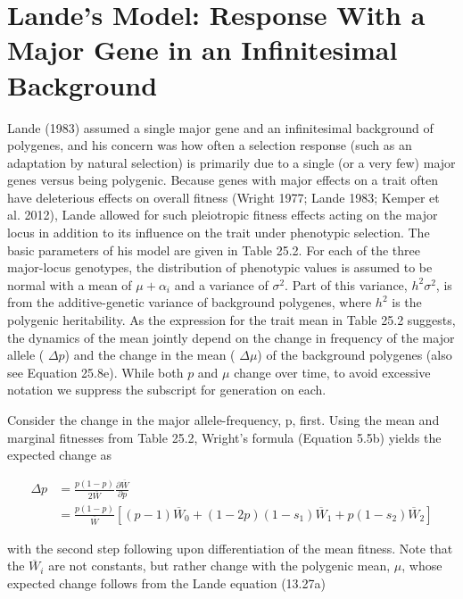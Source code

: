 \documentclass{article}
\begin{document}
\section{Lande's Model: Response With a Major Gene in an Infinitesimal Background}
Lande (1983) assumed a single major gene and an infinitesimal background of polygenes, and his concern was how often a selection response (such as an adaptation by natural selection) is primarily due to a single (or a very few) major genes versus being polygenic. Because genes with major effects on a trait often have deleterious effects on overall fitness (Wright 1977; Lande 1983; Kemper et al. 2012), Lande allowed for such pleiotropic fitness effects acting on the major locus in addition to its influence on the trait under phenotypic selection. The basic parameters of his model are given in Table 25.2. For each of the three major-locus genotypes, the distribution of phenotypic values is assumed to be normal with a mean of  $ \mu + \alpha_i $ and a variance of  $ \sigma^2 $. Part of this variance,  $ h^2 \sigma^2 $, is from the additive-genetic variance of background polygenes, where  $ h^2 $ is the polygenic heritability. As the expression for the trait mean in Table 25.2 suggests, the dynamics of the mean jointly depend on the change in frequency of the major allele ( $ \Delta p $) and the change in the mean ( $ \Delta \mu $) of the background polygenes (also see Equation 25.8e). While both  $ p $ and  $ \mu $ change over time, to avoid excessive notation we suppress the subscript for generation on each.

Consider the change in the major allele-frequency, p, first. Using the mean and marginal fitnesses from Table 25.2, Wright's formula (Equation 5.5b) yields the expected change as

\begin{equation}
\begin{aligned}\Delta p&=\frac{p(1-p)}{2\overline{W}}\frac{\partial\overline{W}}{\partial p}\\&=\frac{p(1-p)}{\overline{W}}\left[(p-1)\overline{W}_{0}+(1-2p)(1-s_{1})\overline{W}_{1}+p(1-s_{2})\overline{W}_{2}\right]\end{aligned}
\tag{25.6}
\label{eq:25_6}
\end{equation}

with the second step following upon differentiation of the mean fitness. Note that the  $ \overline{W}_{i} $ are not constants, but rather change with the polygenic mean,  $ \mu $, whose expected change follows from the Lande equation (13.27a)
\end{document}
